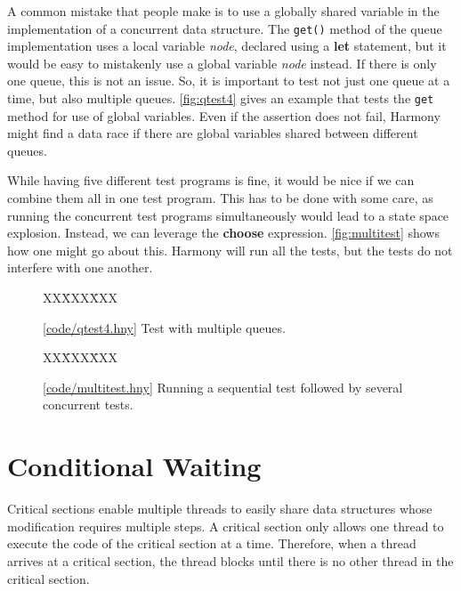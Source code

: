 \documentclass{report}
\newcommand{\harmonysource}[1]{
\begin{tabbing}
XX\=XXX\=XXX\kill
    
\end{tabbing}
}
\newcommand{\harmonylink}[1]{%
[\href{https://harmony.cs.cornell.edu/#1}{\underline{#1}}]%
}
\newenvironment{code}{
\tcolorbox
}{
\endtcolorbox
}
\begin{document}
A common mistake that people make is to use
a globally shared variable in the implementation of
a concurrent data structure.
The \texttt{get()} method of the queue implementation
uses a local variable \textit{node}, declared using
a \textbf{let} statement, but it would be easy to
mistakenly use a global variable \textit{node} instead.
If there is only one queue, this is not an issue.
So, it is important to test not just one queue at a
time, but also multiple queues.
\autoref{fig:qtest4} gives an example that
tests the \texttt{get} method for use of global
variables.  Even if the assertion does not fail,
Harmony might find a data race if there are global
variables shared between different queues.

While having five different test programs is fine,
it would be nice if we can combine them all in one
test program.
This has to be done with some care, as running the
concurrent test programs simultaneously would
lead to a state space explosion.
Instead, we can leverage the \textbf{choose}
expression.
\autoref{fig:multitest} shows how one might go
about this.
Harmony will run all the tests, but the
tests do not interfere with one another.

\begin{figure}
\begin{code}
\harmonysource{qtest4}
\end{code}
\caption{\harmonylink{code/qtest4.hny} Test with multiple queues.}
\label{fig:qtest4}
\end{figure}

\begin{figure}
\begin{code}
\harmonysource{multitest}
\end{code}
\caption{\harmonylink{code/multitest.hny} Running a
sequential test followed by several concurrent tests.}
\label{fig:multitest}
\end{figure}

\chapter{Conditional Waiting}
\label{ch:condwait}

Critical sections enable multiple threads
to easily share data structures whose modification
requires multiple steps.
A critical section only allows one thread to execute the code
of the critical section at a time.
Therefore, when a thread arrives at a critical section,
the thread blocks until there is no other thread in the critical section.
\end{document}
